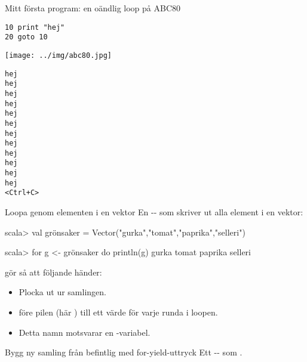 \ifkompendium\else
\begin{SlideExtra}{Mitt första program: en oändlig loop på ABC80}
\begin{minipage}{0.8\textwidth}
\begin{verbatim}
10 print "hej"
20 goto 10
\end{verbatim}
\texttt{[image: ../img/abc80.jpg]}
\end{minipage}%
\begin{minipage}{0.2\textwidth}
\pause
\begin{verbatim}
hej
hej
hej
hej
hej
hej
hej
hej
hej
hej
hej
hej
<Ctrl+C>
\end{verbatim}
\end{minipage}
\end{SlideExtra}
\fi

\begin{Slide}{Loopa genom elementen i en vektor}
En -- som skriver ut alla element i en vektor:
\begin{REPL}
scala> val grönsaker = Vector("gurka","tomat","paprika","selleri")

scala> for g <- grönsaker do println(g)
gurka
tomat
paprika
selleri

\end{REPL}
 gör så att följande händer:
\begin{itemize}
  \item Plocka ut  ur samlingen. 
  \item {} före pilen (här )  till ett  värde för varje runda i loopen.
  \item Detta namn motsvarar en  -variabel.
\end{itemize}
\end{Slide}


\begin{Slide}{Bygg ny samling från befintlig med for-yield-uttryck}
Ett -- som .



\end{Slide}



